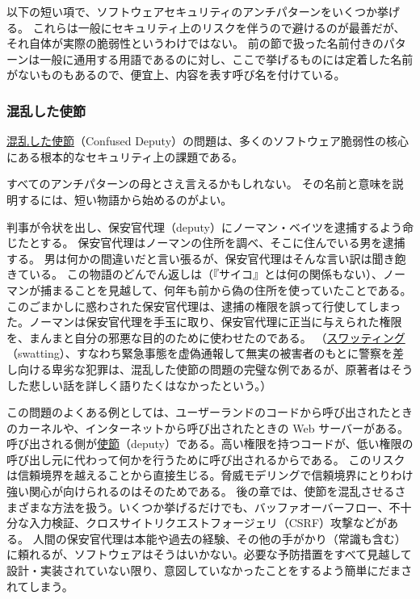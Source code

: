 \documentclass[uplatex]{jsarticle}
\def\label#1{}%
\begin{document}
以下の短い項で、ソフトウェアセキュリティのアンチパターンをいくつか挙げる。
これらは一般にセキュリティ上のリスクを伴うので避けるのが最善だが、それ自体が実際の脆弱性というわけではない。
前の節で扱った名前付きのパターンは一般に通用する用語であるのに対し、ここで挙げるものには定着した名前がないものもあるので、便宜上、内容を表す呼び名を付けている。

\subsubsection{混乱した使節}

\begin{dfn}[混乱した使節]\label{dfn:ch4-confused-deputy}
\underline{混乱した使節}（Confused Deputy）の問題は、多くのソフトウェア脆弱性の核心にある根本的なセキュリティ上の課題である。
\end{dfn}

すべてのアンチパターンの母とさえ言えるかもしれない。
その名前と意味を説明するには、短い物語から始めるのがよい。

\begin{exa}\label{exa:ch4-norman-bates}
判事が令状を出し、保安官代理（deputy）にノーマン・ベイツを逮捕するよう命じたとする。
保安官代理はノーマンの住所を調べ、そこに住んでいる男を逮捕する。
男は何かの間違いだと言い張るが、保安官代理はそんな言い訳は聞き飽きている。
この物語のどんでん返しは（『サイコ』とは何の関係もない）、ノーマンが捕まることを見越して、何年も前から偽の住所を使っていたことである。
このごまかしに惑わされた保安官代理は、逮捕の権限を誤って行使してしまった。ノーマンは保安官代理を手玉に取り、保安官代理に正当に与えられた権限を、まんまと自分の邪悪な目的のために使わせたのである。
（\underline{スワッティング}（swatting）、すなわち緊急事態を虚偽通報して無実の被害者のもとに警察を差し向ける卑劣な犯罪は、混乱した使節の問題の完璧な例であるが、原著者はそうした悲しい話を詳しく語りたくはなかったという。）
\end{exa}

この問題のよくある例としては、ユーザーランドのコードから呼び出されたときのカーネルや、インターネットから呼び出されたときの Web サーバーがある。
呼び出される側が\underline{使節}（deputy）である。高い権限を持つコードが、低い権限の呼び出し元に代わって何かを行うために呼び出されるからである。
このリスクは信頼境界を越えることから直接生じる。脅威モデリングで信頼境界にとりわけ強い関心が向けられるのはそのためである。
後の章では、使節を混乱させるさまざまな方法を扱う。いくつか挙げるだけでも、バッファオーバーフロー、不十分な入力検証、クロスサイトリクエストフォージェリ（CSRF）攻撃などがある。
人間の保安官代理は本能や過去の経験、その他の手がかり（常識も含む）に頼れるが、ソフトウェアはそうはいかない。必要な予防措置をすべて見越して設計・実装されていない限り、意図していなかったことをするよう簡単にだまされてしまう。
\end{document}

